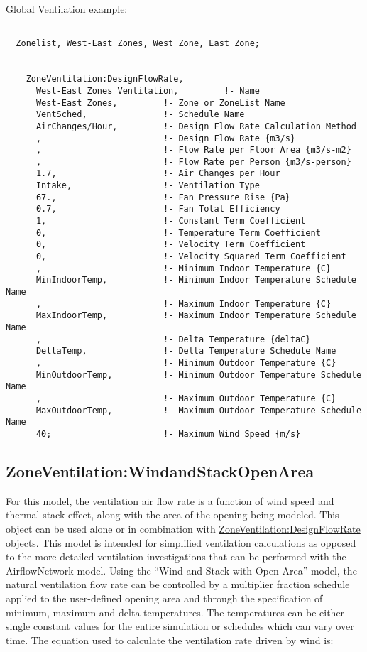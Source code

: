 Global Ventilation example:

\begin{lstlisting}

  Zonelist, West-East Zones, West Zone, East Zone;


    ZoneVentilation:DesignFlowRate,
      West-East Zones Ventilation,         !- Name
      West-East Zones,         !- Zone or ZoneList Name
      VentSched,               !- Schedule Name
      AirChanges/Hour,         !- Design Flow Rate Calculation Method
      ,                        !- Design Flow Rate {m3/s}
      ,                        !- Flow Rate per Floor Area {m3/s-m2}
      ,                        !- Flow Rate per Person {m3/s-person}
      1.7,                     !- Air Changes per Hour
      Intake,                  !- Ventilation Type
      67.,                     !- Fan Pressure Rise {Pa}
      0.7,                     !- Fan Total Efficiency
      1,                       !- Constant Term Coefficient
      0,                       !- Temperature Term Coefficient
      0,                       !- Velocity Term Coefficient
      0,                       !- Velocity Squared Term Coefficient
      ,                        !- Minimum Indoor Temperature {C}
      MinIndoorTemp,           !- Minimum Indoor Temperature Schedule Name
      ,                        !- Maximum Indoor Temperature {C}
      MaxIndoorTemp,           !- Maximum Indoor Temperature Schedule Name
      ,                        !- Delta Temperature {deltaC}
      DeltaTemp,               !- Delta Temperature Schedule Name
      ,                        !- Minimum Outdoor Temperature {C}
      MinOutdoorTemp,          !- Minimum Outdoor Temperature Schedule Name
      ,                        !- Maximum Outdoor Temperature {C}
      MaxOutdoorTemp,          !- Maximum Outdoor Temperature Schedule Name
      40;                      !- Maximum Wind Speed {m/s}
\end{lstlisting}

\subsection{ZoneVentilation:WindandStackOpenArea}\label{zoneventilationwindandstackopenarea}

For this model, the ventilation air flow rate is a function of wind speed and thermal stack effect, along with the area of the opening being modeled. This object can be used alone or in combination with \hyperref[zoneventilationdesignflowrate]{ZoneVentilation:DesignFlowRate} objects. This model is intended for simplified ventilation calculations as opposed to the more detailed ventilation investigations that can be performed with the AirflowNetwork model. Using the ``Wind and Stack with Open Area'' model, the natural ventilation flow rate can be controlled by a multiplier fraction schedule applied to the user-defined opening area and through the specification of minimum, maximum and delta temperatures. The temperatures can be either single constant values for the entire simulation or schedules which can vary over time. The equation used to calculate the ventilation rate driven by wind is:


